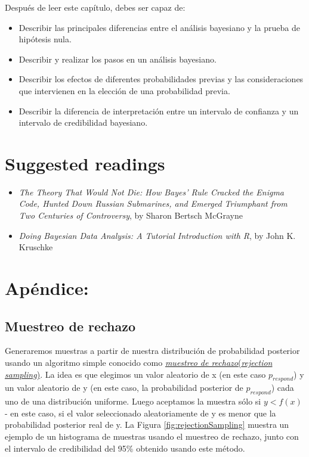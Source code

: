 \documentclass[
  12pt,
]{book}
\providecommand{\tightlist}{%
  \setlength{\itemsep}{0pt}\setlength{\parskip}{0pt}}
\begin{document}
Después de leer este capítulo, debes ser capaz de:

\begin{itemize}
\tightlist
\item
  Describir las principales diferencias entre el análisis bayesiano y la prueba de hipótesis nula.
\item
  Describir y realizar los pasos en un análisis bayesiano.
\item
  Describir los efectos de diferentes probabilidades previas y las consideraciones que intervienen en la elección de una probabilidad previa.
\item
  Describir la diferencia de interpretación entre un intervalo de confianza y un intervalo de credibilidad bayesiano.
\end{itemize}

\hypertarget{suggested-readings}{%
\section{Suggested readings}\label{suggested-readings}}

\begin{itemize}
\tightlist
\item
  \emph{The Theory That Would Not Die: How Bayes' Rule Cracked the Enigma Code, Hunted Down Russian Submarines, and Emerged Triumphant from Two Centuries of Controversy}, by Sharon Bertsch McGrayne
\item
  \emph{Doing Bayesian Data Analysis: A Tutorial Introduction with R}, by John K. Kruschke
\end{itemize}

\hypertarget{apuxe9ndice-3}{%
\section{Apéndice:}\label{apuxe9ndice-3}}

\hypertarget{muestreo-de-rechazo}{%
\subsection{Muestreo de rechazo}\label{muestreo-de-rechazo}}

Generaremos muestras a partir de nuestra distribución de probabilidad posterior usando un algoritmo simple conocido como \href{https://am207.github.io/2017/wiki/rejectionsampling.html}{\emph{muestreo de rechazo}(\emph{rejection sampling})}. La idea es que elegimos un valor aleatorio de x (en este caso \(p_{respond}\)) y un valor aleatorio de y (en este caso, la probabilidad posterior de \(p_{respond}\)) cada uno de una distribución uniforme. Luego aceptamos la muestra sólo si \(y < f(x)\) - en este caso, si el valor seleccionado aleatoriamente de y es menor que la probabilidad posterior real de y. La Figura \ref{fig:rejectionSampling} muestra un ejemplo de un histograma de muestras usando el muestreo de rechazo, junto con el intervalo de credibilidad del 95\% obtenido usando este método.
\end{document}
